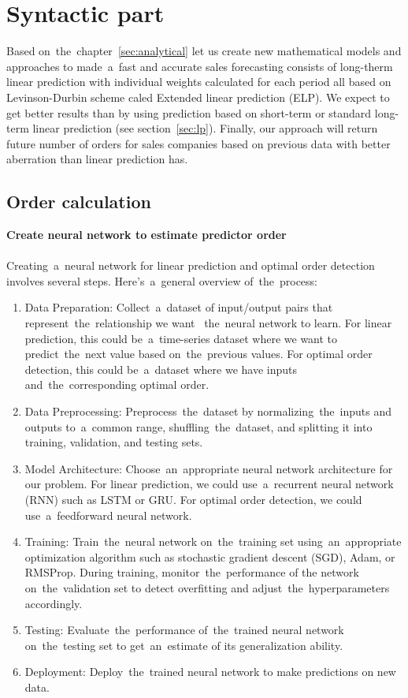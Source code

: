 \chapter{Syntactic part}\label{sec:syntactic}
Based on~the~chapter~\ref{sec:analytical} let us create new mathematical models and approaches to made~a~fast
and accurate sales forecasting consists of long-therm linear prediction with individual weights calculated for each
period all based on Levinson-Durbin scheme caled Extended linear prediction (ELP).
We expect to get better results than by using prediction based on short-term or standard long-term linear
prediction (see section~\ref{sec:lp}).  Finally, our approach will return future number of orders for sales companies
based on previous data with better aberration than linear prediction has.
    \section{Order calculation}\label{sec:ordercalc}
        \textbf{Create neural network to estimate predictor order}\\
        \\
        Creating~a~neural network for linear prediction and optimal order detection involves several steps.
        Here's~a~general overview of~the~process:
        \begin{enumerate}
            \item Data Preparation: Collect~a~dataset of input/output pairs that represent~the~relationship we want
           ~the~neural network to learn. For linear prediction, this could be~a~time-series dataset where we want to
            predict~the~next value based on~the~previous values. For optimal order detection, this could be~a~dataset
            where we have inputs and~the~corresponding optimal order.
            \item Data Preprocessing: Preprocess~the~dataset by normalizing~the~inputs and outputs to~a~common range,
            shuffling~the~dataset, and splitting it into training, validation, and testing sets.
            \item Model Architecture: Choose~an~appropriate neural network architecture for our problem. For linear
            prediction, we could use~a~recurrent neural network (RNN) such as LSTM or GRU. For optimal order
            detection, we could use~a~feedforward neural network.
            \item Training: Train~the~neural network on~the~training set using~an~appropriate optimization algorithm
            such as stochastic gradient descent (SGD), Adam, or RMSProp. During training, monitor~the~performance of the
            network on~the~validation set to detect overfitting and adjust~the~hyperparameters accordingly.
            \item Testing: Evaluate~the~performance of~the~trained neural network on~the~testing set
            to get~an~estimate of its generalization ability.
            \item Deployment: Deploy~the~trained neural network to make predictions on new data.
        \end{enumerate}

